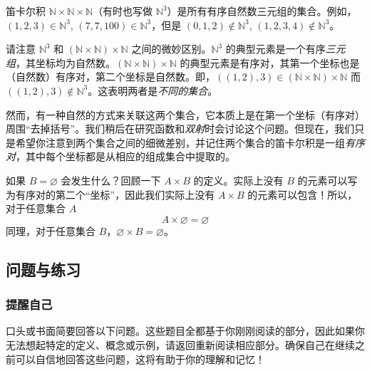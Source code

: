 \begin{example}
    笛卡尔积 $\mathbb{N} \times \mathbb{N} \times \mathbb{N}$（有时也写做 $\mathbb{N}^3$）是所有有序自然数三元组的集合。例如，$(1, 2, 3) \in \mathbb{N}^3$, $(7, 7, 100) \in \mathbb{N}^3$，但是 $(0, 1, 2) \notin \mathbb{N}^3$, $(1, 2, 3, 4) \notin \mathbb{N}^3$。
\end{example}

请注意 $\mathbb{N}^3$ 和 $(\mathbb{N} \times \mathbb{N}) \times \mathbb{N}$ 之间的微妙区别。$\mathbb{N}^3$ 的典型元素是一个有序\emph{三元组}，其坐标均为自然数。$(\mathbb{N} \times \mathbb{N}) \times \mathbb{N}$ 的典型元素是有序对，其第一个坐标也是（自然数）有序对，第二个坐标是自然数。即，$((1, 2), 3) \in (\mathbb{N} \times \mathbb{N}) \times \mathbb{N}$ 而 $((1, 2), 3) \notin \mathbb{N}^3$。这表明两者是\emph{不同的集合}。

然而，有一种自然的方式来关联这两个集合，它本质上是在第一个坐标（有序对）周围``去掉括号''。我们稍后在研究函数和\emph{双射}时会讨论这个问题。但现在，我们只是希望你注意到两个集合之间的细微差别，并记住两个集合的笛卡尔积是一组\emph{有序对}，其中每个坐标都是从相应的组成集合中提取的。

\begin{example}
    如果 $B = \varnothing$ 会发生什么？回顾一下 $A \times B$ 的定义。实际上没有 $B$ 的元素可以写为有序对的第二个``坐标''，因此我们实际上没有 $A \times B$ 的元素可以包含！所以，对于任意集合 $A$
    \[A \times \varnothing = \varnothing\]
    同理，对于任意集合 $B$，$\varnothing \times B = \varnothing$。
\end{example}

\subsection{问题与练习}

\subsubsection*{提醒自己}

口头或书面简要回答以下问题。这些题目全都基于你刚刚阅读的部分，因此如果你无法想起特定的定义、概念或示例，请返回重新阅读相应部分。确保自己在继续之前可以自信地回答这些问题，这将有助于你的理解和记忆！

